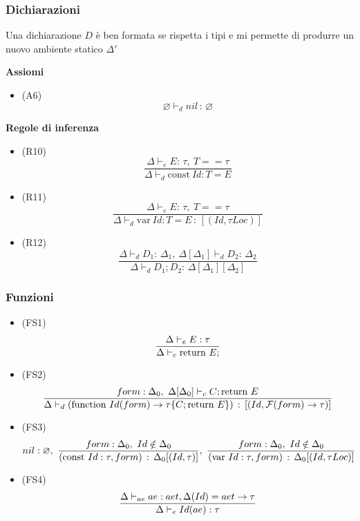 \documentclass{article}
\begin{document}
\subsubsection{Dichiarazioni}
Una dichiarazione \(D\) è ben formata se rispetta i tipi e mi permette di produrre un nuovo ambiente statico \(\Delta'\)

\vspace{.2cm}

\noindent\textbf{Assiomi}
\begin{itemize}
    \item (A6) \[\varnothing \vdash_d nil \,:\, \varnothing\]
\end{itemize}

\noindent\textbf{Regole di inferenza}
\begin{itemize}
    \item (R10)
          \[\frac
              {\Delta \vdash_e E:\, \tau,\ T == \tau}
              {\Delta \vdash_d \text{const}\ Id:T = E}\]

    \item (R11)
          \[\frac
              {\Delta \vdash_e E:\, \tau,\ T == \tau}
              {\Delta \vdash_d \text{var}\ Id:T = E \,:\, [(Id, \tau Loc)]}\]

    \item (R12)
          \[\frac
              {\Delta \vdash_d D_1:\, \Delta_1,\ \Delta[\Delta_1] \vdash_d D_2:\, \Delta_2}
              {\Delta \vdash_d D_1;D_2:\, \Delta[\Delta_1][\Delta_2]}\]
\end{itemize}


\subsubsection{Funzioni}
\begin{itemize}
    \item (FS1)
          \[\frac{\displaystyle \Delta \vdash_e E : \tau}{\displaystyle \Delta \vdash_c \text{return}\ E;}
          \]
    \item (FS2)
          \[\frac{\displaystyle 
                  form : \Delta_0,\
                  \Delta[\Delta_0] \vdash_c C; \text{return}\ E
              }{\displaystyle 
                  \Delta \vdash_d (\text{function}\ Id(form) \rightarrow \tau \{C;\text{return}\ E\}) \,:\, [(Id, \mathcal{F}(form) \rightarrow \tau)]
              }
          \]
    \item (FS3)
          \[
              nil : \varnothing,\
              \frac{\displaystyle 
                  form : \Delta_0,\ Id \notin \Delta_0
              }{\displaystyle 
                  (\text{const}\ Id:\tau, form) \,:\, \Delta_0[(Id, \tau)]
              },\
              \frac{\displaystyle 
                  form : \Delta_0,\ Id \notin \Delta_0
              }{\displaystyle 
                  (\text{var}\ Id:\tau, form) \,:\, \Delta_0[(Id, \tau Loc)]
              }
          \]
    \item (FS4)
          \[\frac{\displaystyle 
                  \Delta \vdash_{ae} ae : aet, \Delta(Id) = aet \rightarrow \tau
              }{\displaystyle 
                  \Delta \vdash_e Id(ae) : \tau
              }
          \]
\end{itemize}
\end{document}
